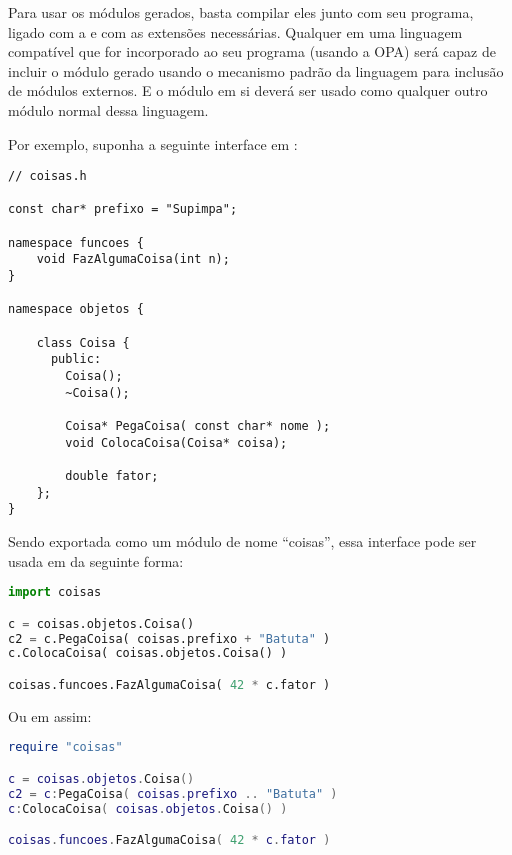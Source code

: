 Para usar os módulos gerados, basta compilar eles junto com seu programa, ligado com
a  e com as extensões necessárias. Qualquer \script{} em uma
linguagem compatível que for incorporado ao seu programa (usando a OPA) será
capaz de incluir o módulo gerado usando o mecanismo padrão da linguagem para
inclusão de módulos externos. E o módulo em si deverá ser usado como qualquer
outro módulo normal dessa linguagem.

Por exemplo, suponha a seguinte interface em \CXX{}:
\begin{lstlisting}
// coisas.h

const char* prefixo = "Supimpa";

namespace funcoes {
    void FazAlgumaCoisa(int n);
}

namespace objetos {

    class Coisa {
      public:
        Coisa();
        ~Coisa();
        
        Coisa* PegaCoisa( const char* nome );
        void ColocaCoisa(Coisa* coisa);
        
        double fator;
    };
}
\end{lstlisting}

Sendo exportada como um módulo de nome ``coisas'', essa interface pode ser usada em 
da seguinte forma:

\begin{lstlisting}[language=python]
import coisas

c = coisas.objetos.Coisa()
c2 = c.PegaCoisa( coisas.prefixo + "Batuta" )
c.ColocaCoisa( coisas.objetos.Coisa() )

coisas.funcoes.FazAlgumaCoisa( 42 * c.fator )
\end{lstlisting}

Ou em  assim:
\begin{lstlisting}[language=lua]
require "coisas"

c = coisas.objetos.Coisa()
c2 = c:PegaCoisa( coisas.prefixo .. "Batuta" )
c:ColocaCoisa( coisas.objetos.Coisa() )

coisas.funcoes.FazAlgumaCoisa( 42 * c.fator )
\end{lstlisting}
